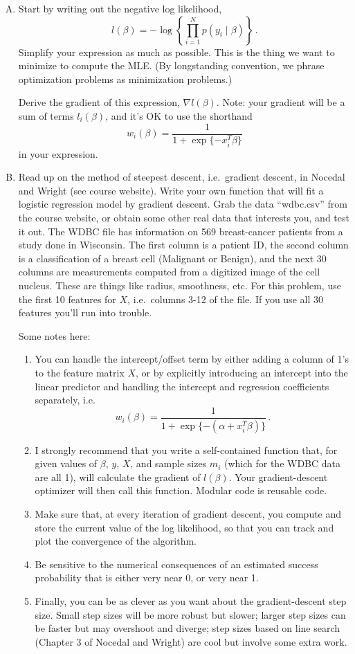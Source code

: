 \documentclass{mynotes}
\begin{document}
\begin{enumerate}[(A)]
\item Start by writing out the negative log likelihood,
$$
l(\beta) = - \log \left \{ \prod_{i=1}^N p(y_i \mid \beta) \right \} \, .
$$
Simplify your expression as much as possible. This is the thing we want to minimize to compute the MLE.  (By longstanding convention, we phrase optimization problems as minimization problems.)

Derive the gradient of this expression, $\nabla l(\beta)$.   Note: your gradient will be a sum of terms $l_i(\beta)$, and it's OK to use the shorthand
$$
w_i(\beta) =  \frac{1}{1 + \exp\{-x_i^T \beta\}}
$$
in your expression.


\item Read up on the method of steepest descent, i.e.~gradient descent, in Nocedal and Wright (see course website).  Write your own function that will fit a logistic regression model by gradient descent.  Grab the data ``wdbc.csv'' from the course website, or obtain some other real data that interests you, and test it out.  The WDBC file has information on 569 breast-cancer patients from a study done in Wisconsin.  The first column is a patient ID, the second column is a classification of a breast cell (Malignant or Benign), and the next 30 columns are measurements computed from a digitized image of the cell nucleus.  These are things like radius, smoothness, etc.  For this problem, use the first 10 features for $X$, i.e.~columns 3-12 of the file.  If you use all 30 features you'll run into trouble.

Some notes here:
\begin{enumerate}[1.]
\item You can handle the intercept/offset term by either adding a column of 1's to the feature matrix $X$, or by explicitly introducing an intercept into the linear predictor and handling the intercept and regression coefficients separately, i.e.
$$
w_i(\beta) =  \frac{1}{1 + \exp\{-(\alpha + x_i^T \beta )\}} \, .
$$
\item I strongly recommend that you write a self-contained function that, for given values of $\beta$, $y$, $X$, and sample sizes $m_i$ (which for the WDBC data are all 1), will calculate the gradient of $l(\beta)$.  Your gradient-descent optimizer will then call this function.  Modular code is reusable code.
\item Make sure that, at every iteration of gradient descent, you compute and store the current value of the log likelihood, so that you can track and plot the convergence of the algorithm.
\item Be sensitive to the numerical consequences of an estimated success probability that is either very near 0, or very near 1.
\item Finally, you can be as clever as you want about the gradient-descent step size.  Small step sizes will be more robust but slower; larger step sizes can be faster but may overshoot and diverge; step sizes based on line search (Chapter 3 of Nocedal and Wright) are cool but involve some extra work.
\end{enumerate}



\end{enumerate}
\end{document}
